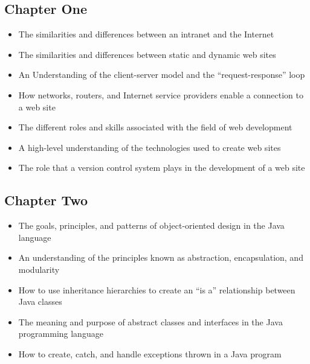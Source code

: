 \documentclass[11pt]{article}
\begin{document}
\vspace*{-.1in}

\subsection*{Chapter One}

\begin{itemize}

  \itemsep 0in

  \item The similarities and differences between an intranet and the Internet
  \item The similarities and differences between static and dynamic web sites
  \item An Understanding of the client-server model and the ``request-response''
    loop
  \item How networks, routers, and Internet service providers enable a
    connection to a web site
  \item The different roles and skills associated with the field of web development
  \item A high-level understanding of the technologies used to create web sites
  \item The role that a version control system plays in the development of a web
    site

\end{itemize}

\vspace*{-.2in}
\subsection*{Chapter Two}

\begin{itemize}

  \itemsep 0in

  \item The goals, principles, and patterns of object-oriented design in the
    Java language
  \item An understanding of the principles known as abstraction, encapsulation, and modularity
  \item How to use inheritance hierarchies to create an ``is a'' relationship
    between Java classes
  \item The meaning and purpose of abstract classes and interfaces in the Java
    programming language
  \item How to create, catch, and handle exceptions thrown in a Java program

\end{itemize}
\end{document}
